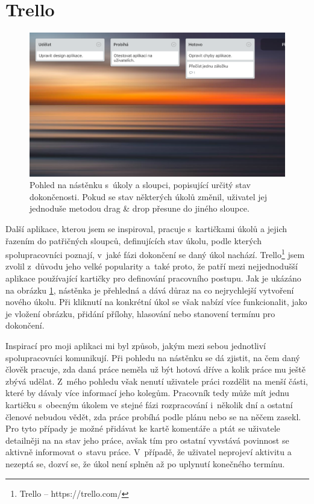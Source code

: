 \section{Trello}

\begin{figure}[H]
\centering
\includegraphics[width= 12cm]{obrazky-figures/IMG_0338}
\caption{Pohled na nástěnku s~úkoly a sloupci, popisující určitý stav dokončenosti. Pokud se stav některých úkolů změnil, uživatel jej jednoduše metodou drag \& drop přesune do jiného sloupce.}
\label{trello}
\end{figure}

Další aplikace, kterou jsem se inspiroval, pracuje s~kartičkami úkolů a jejich řazením do patřičných sloupců, definujících stav úkolu, podle kterých spolupracovníci poznají, v~jaké fázi dokončení se daný úkol nachází. Trello\footnote{Trello -- https://trello.com/} jsem zvolil z~důvodu jeho velké popularity a~také proto, že patří mezi nejjednodušší aplikace používající kartičky pro definování pracovního postupu. Jak je ukázáno na obrázku \ref{trello}, nástěnka je přehledná a dává důraz na co nejrychlejší vytvoření nového úkolu. Při kliknutí na konkrétní úkol se však nabízí více funkcionalit, jako je vložení obrázku, přidání přílohy, hlasování nebo stanovení termínu pro dokončení. 

Inspirací pro moji aplikaci mi byl způsob, jakým mezi sebou jednotliví spolupracovníci komunikují. Při pohledu na nástěnku se dá zjistit, na čem daný člověk pracuje, zda daná práce neměla už být hotová dříve a kolik práce mu ještě zbývá udělat. Z~mého pohledu však nenutí uživatele práci rozdělit na menší části, které by dávaly více informací jeho kolegům. Pracovník tedy může mít jednu kartičku s~obecným úkolem ve stejné fázi rozpracování i~několik dní a ostatní členové nebudou vědět, zda práce probíhá podle plánu nebo se na něčem zasekl. Pro tyto případy je možné přidávat ke kartě komentáře a ptát se uživatele detailněji na na stav jeho práce, avšak tím pro ostatní vyvstává povinnost se aktivně informovat o~stavu práce. V~případě, že uživatel neprojeví aktivitu a nezeptá se, dozví se, že úkol není splněn až po uplynutí konečného termínu.

